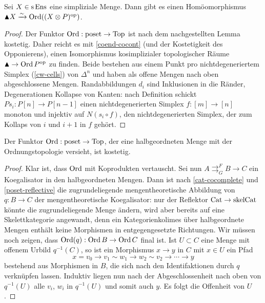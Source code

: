 \begin{prop} \label{clumsy-order-top}
  Sei $X \in \operatorname{s}\operatorname{Ens}$ eine simpliziale Menge. Dann gibt es einen
  Homöomorphismus $\blacktriangle X \xrightarrow[]{\sim} \operatorname{Ord}((X \otimes P)^\mathrm{op})$.
\end{prop}
\begin{proof}
  Der Funktor $\operatorname{Ord}: \operatorname{poset} \to \operatorname{Top}$ ist nach dem nachgestellten
  Lemma kostetig. Daher reicht es mit \ref{coend-cocont} (und der
  Kostetigkeit des Opponierens), einen Isomorphismus kosimplizialer
  topologischer Räume $\blacktriangle \to \operatorname{Ord} P^\mathrm{op}$ zu finden. Beide
  bestehen aus einem Punkt pro nichtdegeneriertem Simplex
  (\ref{cw-cells}) von $\Delta^n$ und haben als offene Mengen nach
  oben abgeschlossene Mengen. Randabbildungen $d_i$ sind Inklusionen
  in die Ränder, Degenerationen Kollapse von Kanten: nach Definition
  schickt $Ps_i: P[n] \to P[n-1]$ einen nichtdegenerierten Simplex $f:
  [m] \to [n]$ monoton und injektiv auf $N(s_i \circ f)$, den
  nichtdegenerierten Simplex, der zum Kollaps von $i$ und $i+1$ in $f$
  gehört.
\end{proof}
\begin{lemma}
  Der Funktor $\operatorname{Ord}: \operatorname{poset} \to \operatorname{Top}$, der eine halbgeordneten Menge
  mit der Ordnungstopologie versieht, ist kostetig.
\end{lemma}
\begin{proof}
    Klar ist, dass $\operatorname{Ord}$ mit Koprodukten vertauscht. Sei nun $A
    \mathrel{\mathop{\rightrightarrows}^{F}_{G}} B \to C$ ein
    Koegalisator in den halbgeordneten Mengen. Dann ist nach
    \ref{cat-cocomplete} und \ref{poset-reflective} die
    zugrundeliegende mengentheoretische Abbildung von $q: B \to C$ der
    mengentheoretische Koegalisator: nur der Reflektor $\operatorname{Cat} \to
    \mathrm{skelCat}$ könnte die zugrundeliegende Menge ändern, wird
    aber bereits auf eine Skelettkategorie angewandt, denn ein
    Kategorienkolimes über halbgeordnete Mengen enthält keine
    Morphismen in entgegengesetzte Richtungen. Wir müssen noch zeigen,
    dass $\operatorname{Ord}(q): \operatorname{Ord} B \to \operatorname{Ord} C$ final ist. Ist $U \subset C$
    eine Menge mit offenem Urbild $q^{-1}(C)$, so ist ein Morphismus
    $x \to y$ in $C$ mit $x \in U$ ein Pfad
    \[ x = v_0 \to v_1 \sim w_1 \to w_2 \sim v_2 \to \cdots \to y \]
    bestehend aus Morphismen in $B$, die sich nach den Identifaktionen
    durch $q$ verknüpfen lassen. Induktiv liegen nun nach der
    Abgeschlossenheit nach oben von $q^{-1}(U)$ alle $v_i$, $w_i$ in
    $q^{-1}(U)$ und somit auch $y$. Es folgt die Offenheit von $U$.
\end{proof}

